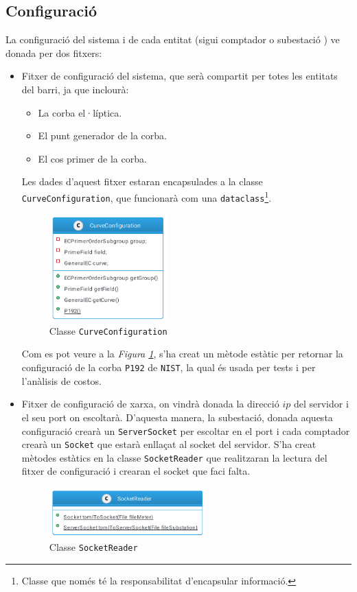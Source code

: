 \subsection{Configuració}
La configuració del sistema i de cada entitat (sigui comptador o subestació ) ve donada per dos fitxers:
\begin{itemize}
	\item Fitxer de configuració del sistema, que serà compartit per totes les entitats del barri, ja que inclourà:
	\begin{itemize}
		\item La corba el·líptica.
		\item El punt generador de la corba.
		\item El cos primer de la corba.
	\end{itemize}
	Les dades d'aquest fitxer estaran encapsulades a la classe \texttt{CurveConfiguration}, que funcionarà com una \texttt{dataclass}\footnote{Classe que només té la responsabilitat d'encapsular informació.}.
	\begin{figure}[H]
		\centering
		\includegraphics[width=4.5cm]{classes/curve.png}
		\caption{Classe \texttt{CurveConfiguration}}
		\label{fig:curve}
	\end{figure}
	Com es pot veure a la \textit{Figura \ref{fig:curve}}, s'ha creat un mètode estàtic per retornar la configuració de la corba \texttt{P192} de \texttt{NIST}, la qual és usada per tests i per l'anàlisis de costos.
	\item Fitxer de configuració de xarxa, on vindrà donada la direcció $ip$ del servidor i el seu port on escoltarà. D'aquesta manera, la subestació, donada aquesta configuració crearà un \texttt{ServerSocket} per escoltar en el port i cada comptador crearà un \texttt{Socket} que estarà enllaçat al socket del servidor. S'ha creat mètodes estàtics en la classe \texttt{SocketReader} que realitzaran la lectura del fitxer de configuració i crearan el socket que faci falta.
	\begin{figure}[H]
		\centering
		\includegraphics[width=6cm]{classes/socket.png}
		\caption{Classe \texttt{SocketReader}}
		\label{fig:socket}
	\end{figure}
	
\end{itemize}
